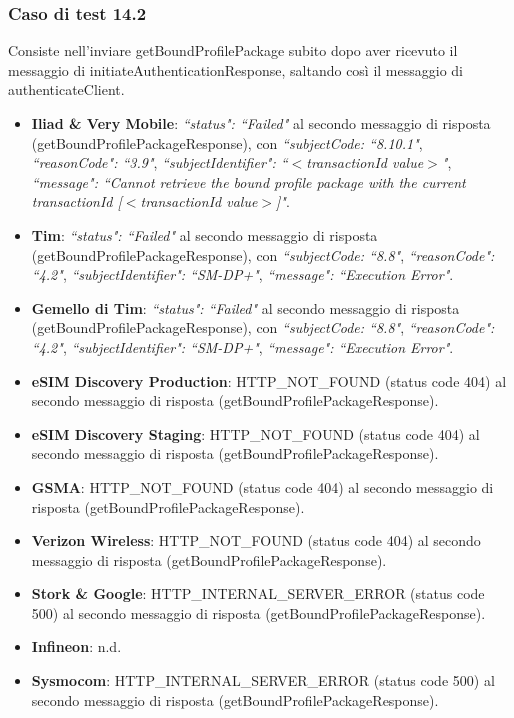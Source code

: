 \documentclass[10pt, oneside]{book}
\begin{document}
\subsubsection{Caso di test 14.2}
Consiste nell'inviare getBoundProfilePackage subito dopo aver ricevuto il messaggio di initiateAuthenticationResponse, saltando così il messaggio di authenticateClient.
\begin{itemize}
\item \textbf{Iliad \& Very Mobile}: \textit{``status": ``Failed"} al secondo messaggio di risposta (getBoundProfilePackageResponse), con \textit{``subjectCode: ``8.10.1"}, \textit{``reasonCode": ``3.9"}, \textit{``subjectIdentifier": ``$<$transactionId value$>$"}, \textit{``message": ``Cannot retrieve the bound profile package with the current transactionId [$<$transactionId value$>$]"}.
\item \textbf{Tim}: \textit{``status": ``Failed"} al secondo messaggio di risposta (getBoundProfilePackageResponse), con \textit{``subjectCode: ``8.8"}, \textit{``reasonCode": ``4.2"}, \textit{``subjectIdentifier": ``SM-DP+"}, \textit{``message": ``Execution Error"}.
\item \textbf{Gemello di Tim}: \textit{``status": ``Failed"} al secondo messaggio di risposta (getBoundProfilePackageResponse), con \textit{``subjectCode: ``8.8"}, \textit{``reasonCode": ``4.2"}, \textit{``subjectIdentifier": ``SM-DP+"}, \textit{``message": ``Execution Error"}.
\item \textbf{eSIM Discovery Production}: HTTP\_NOT\_FOUND (status code 404) al secondo messaggio di risposta (getBoundProfilePackageResponse).
\item \textbf{eSIM Discovery Staging}: HTTP\_NOT\_FOUND (status code 404) al secondo messaggio di risposta (getBoundProfilePackageResponse).
\item \textbf{GSMA}: HTTP\_NOT\_FOUND (status code 404) al secondo messaggio di risposta (getBoundProfilePackageResponse).
\item \textbf{Verizon Wireless}: HTTP\_NOT\_FOUND (status code 404) al secondo messaggio di risposta (getBoundProfilePackageResponse).
\item \textbf{Stork \& Google}: HTTP\_INTERNAL\_SERVER\_ERROR (status code 500) al secondo messaggio di risposta (getBoundProfilePackageResponse).
\item \textbf{Infineon}: n.d.
\item \textbf{Sysmocom}: HTTP\_INTERNAL\_SERVER\_ERROR (status code 500) al secondo messaggio di risposta (getBoundProfilePackageResponse).

\end{itemize}
\end{document}

